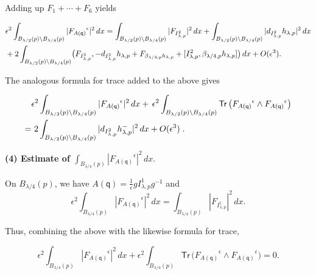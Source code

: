 \documentclass[11pt]{article}
\numberwithin{equation}{section} \setlength{\topmargin}{-35pt}
\newcommand{\q}{\mathsf{q}}
\newcommand{\tr}{\mathsf{Tr}}
\begin{document}
\medskip
\noindent Adding up $F_1+\cdots +F_6$ yields

\begin{align}
\label{YM3-I} &\epsilon^2\int_{B_{\lambda/2}(p)\setminus
B_{\lambda/4}(p)}|{F_{A(\q)}}^{\epsilon}|^2\,dx
=\int_{B_{\lambda/2}(p)\setminus
B_{\lambda/4}(p)}|F_{I^2_{\lambda,p}}|^2\,dx+
\int_{B_{\lambda/2}(p)\setminus B_{\lambda/4}(p)}|d_{I^2_{\lambda,p}}h_{\lambda,p}|^2\,dx\notag\\
&+2\int_{B_{\lambda/2}(p)\setminus
B_{\lambda/4}(p)}\bigl(F_{I^2_{\lambda,p}},-d_{I^2_{\lambda,p}}h_{\lambda,p}
+ F_{\beta_{\lambda/4,p}h_{\lambda,p}}+
[I^2_{\lambda,p},\beta_{\lambda/4,p}h_{\lambda,p}]\bigr)\,dx+O(\epsilon^3).
\end{align}

\noindent The analogous formula for trace added to the above gives

\begin{align}
\label{D3} &\epsilon^2\int_{B_{\lambda/2}(p)\setminus
B_{\lambda/4}(p)}|{F_{A(\q)}}^{\epsilon}|^2\,dx +
\,\epsilon^2\int_{B_{\lambda/2}(p)\setminus
B_{\lambda/4}(p)}\tr\,\bigl({F_{A(\q)}}^{\epsilon}\wedge
{F_{A(\q)}}^{\epsilon}\bigr)
\notag\\
=&~2\int_{B_{\lambda/2}(p)\setminus
B_{\lambda/4}(p)}|d_{I^2_{\lambda,p}}h_{\lambda,p}^-|^2\,dx+O(\epsilon^3)\;.
\end{align}

\medskip

\noindent\textbf{(4) Estimate of
$\int_{B_{\lambda/4}(p)}|{F_{A(\q)}}^{\epsilon}|^2\,dx$}\;.

\noindent On $B_{\lambda/4}(p)$, we have
$A(\q)=\frac{1}{\epsilon}gI^1_{\lambda,p}g^{-1}$ and
\begin{equation}
\label{YM4}
\epsilon^2\int_{B_{\lambda/4}(p)}|{F_{A(\q)}}^{\epsilon}|^2\,dx=\int_{B_{\lambda/4}(p)}|F_{I^1_{\lambda,p}}|^2\,dx.
\end{equation}

\noindent Thus, combining the above with the likewise formula for
trace,

\begin{equation}
\label{D4}
\epsilon^2\int_{B_{\lambda/4}(p)}|{F_{A(\q)}}^{\epsilon}|^2\,dx+
\epsilon^2\int_{B_{\lambda/4}(p)}\tr\,\bigl({F_{A(\q)}}^{\epsilon}\wedge
{F_{A(\q)}}^{\epsilon}\bigr)=0.
\end{equation}
\end{document}
